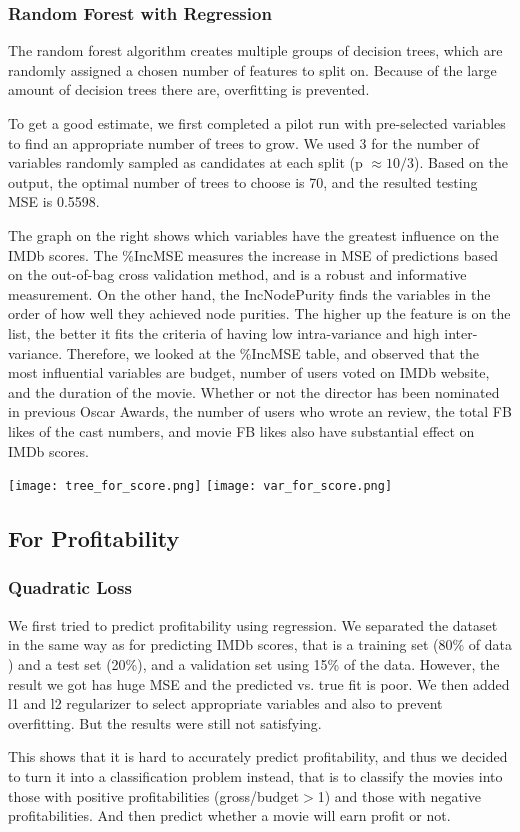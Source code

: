 \documentclass[12pt]{article}
\begin{document}
\subsubsection{Random Forest with Regression}
The random forest algorithm creates multiple groups of decision trees, which are randomly assigned a chosen number of features to split on. Because of the large amount of decision trees there are, overfitting is prevented. \par
To get a good estimate, we first completed a pilot run with pre-selected variables to find an appropriate number of trees to grow. We used 3 for the number of variables randomly sampled as candidates at each split (p $\approx 10/3$). Based on the output, the optimal number of trees to choose is 70, and the resulted testing MSE is 0.5598. \par
The graph on the right shows which variables have the greatest influence on the IMDb scores. The \%IncMSE measures the increase in MSE of predictions based on the out-of-bag cross validation method, and is a robust and informative measurement. On the other hand, the IncNodePurity finds the variables in the order of how well they achieved node purities. The higher up the feature is on the list, the better it fits the criteria of having low intra-variance and high inter-variance. Therefore, we looked at the \%IncMSE table, and observed that the most influential variables are budget, number of users voted on IMDb website, and the duration of the movie. Whether or not the director has been nominated in previous Oscar Awards, the number of users who wrote an review, the total FB likes of the cast numbers, and movie FB likes also have substantial effect on IMDb scores. 

\begin{center}
\texttt{[image: tree\_for\_score.png]}
\texttt{[image: var\_for\_score.png]}\\
\end{center}

\subsection {For Profitability}
\subsubsection {Quadratic Loss}
We first tried to predict profitability using regression. We separated the dataset in the same way as for predicting IMDb scores, that is a training set (80\% of data ) and a test set (20\%), and a validation set using 15\% of the data. However, the result we got has huge MSE and the predicted vs. true fit is poor. We then added l1 and l2 regularizer to select appropriate variables and also to prevent overfitting. But the results were still not satisfying. \par
	This shows that it is hard to accurately predict profitability, and thus we decided to turn it into a classification problem instead, that is to classify the movies into those with positive profitabilities (gross/budget$>$1) and those with negative profitabilities. And then predict whether a movie will earn profit or not. 
\end{document}
